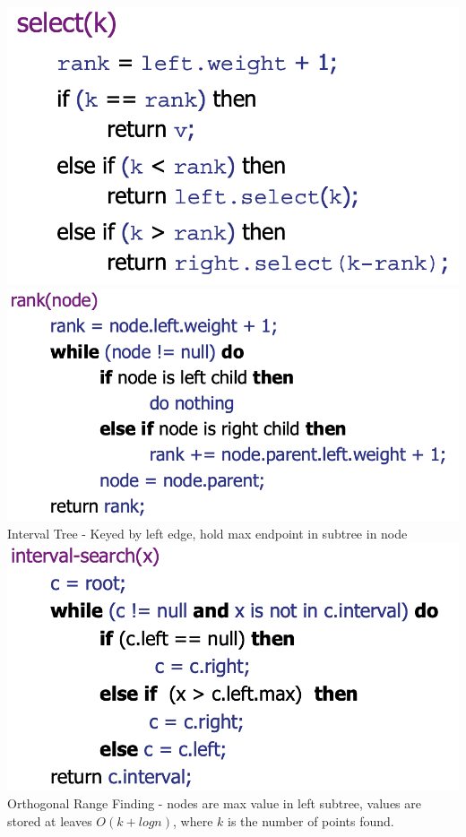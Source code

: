 \documentclass[10pt, a4paper]{article}
\begin{document}
\begin{multicols*}{3}
		\includegraphics[scale=0.25]{Select} \includegraphics[scale=.3]{rank}\\
		Interval Tree - Keyed by left edge, hold max endpoint in subtree in node\\
		\includegraphics[scale=.25]{Interval}\\
		Orthogonal Range Finding - nodes are max value in left subtree, values are stored at leaves $O(k + logn)$, where $k$ is the number of points found.\\

\end{multicols*}
\end{document}

